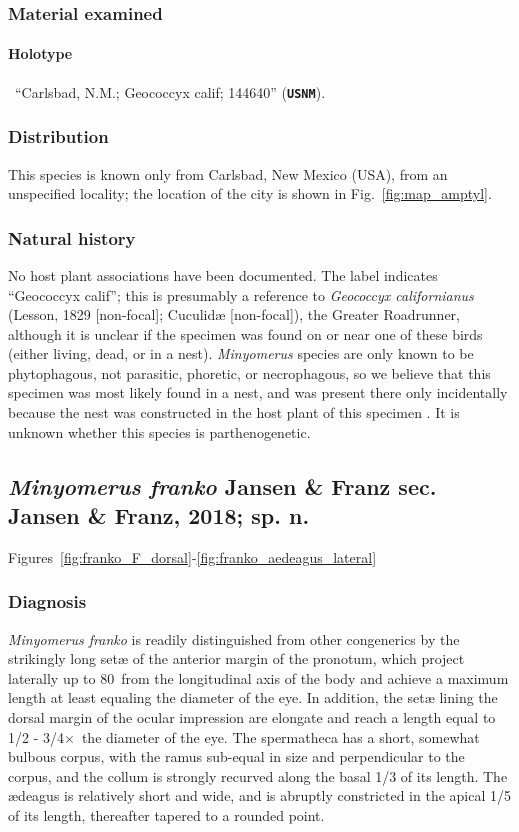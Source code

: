 \documentclass[fleqn,10pt,lineno]{wlpeerj} %
\newcommand{\td}{\textdegree~}
\newcommand{\x}{$\times$~}
\begin{document}
		\subsubsection*{Material examined}
			\paragraph{Holotype}
				\female~``Carlsbad, N.M.; Geococcyx calif; 144640'' (\texttt{\textbf{USNM}}).
		\subsubsection*{Distribution}
			This species is known only from Carlsbad, New Mexico (USA), from an unspecified locality; the location of the city is shown in Fig.~\ref{fig:map_amptyl}.
		\subsubsection*{Natural history}
			No host plant associations have been documented.
			The label indicates ``Geococcyx calif''; this is presumably a reference to \textit{Geococcyx californianus} (Lesson, 1829 [non-focal]; Cuculid{\ae} [non-focal]), the Greater Roadrunner, although it is unclear if the specimen was found on or near one of these birds (either living, dead, or in a nest).
			\textit{Minyomerus} species are only known to be phytophagous, not parasitic, phoretic, or necrophagous, so we believe that this specimen was most likely found in a nest, and was present there only incidentally because the nest was constructed in the host plant of this specimen \citep{jansen2015}.
			It is unknown whether this species is parthenogenetic.
			
	\subsection*{\textit{Minyomerus franko} Jansen \& Franz sec. Jansen \& Franz, 2018; sp. n.}\label{ssec:franko}
		Figures~\ref{fig:franko_F_dorsal}-\ref{fig:franko_aedeagus_lateral}
		\subsubsection*{Diagnosis}
			\textit{Minyomerus franko} is readily distinguished from other congenerics by the strikingly long set{\ae} of the anterior margin of the pronotum, which project laterally up to 80\td from the longitudinal axis of the body and achieve a maximum length at least equaling the diameter of the eye.
			In addition, the set{\ae} lining the dorsal margin of the ocular impression are elongate and reach a length equal to 1/2 - 3/4\x the diameter of the eye.
			The spermatheca has a short, somewhat bulbous corpus, with the ramus sub-equal in size and perpendicular to the corpus, and the collum is strongly recurved along the basal 1/3 of its length.
			The {\ae}deagus is relatively short and wide, and is abruptly constricted in the apical 1/5 of its length, thereafter tapered to a rounded point.
\end{document}

